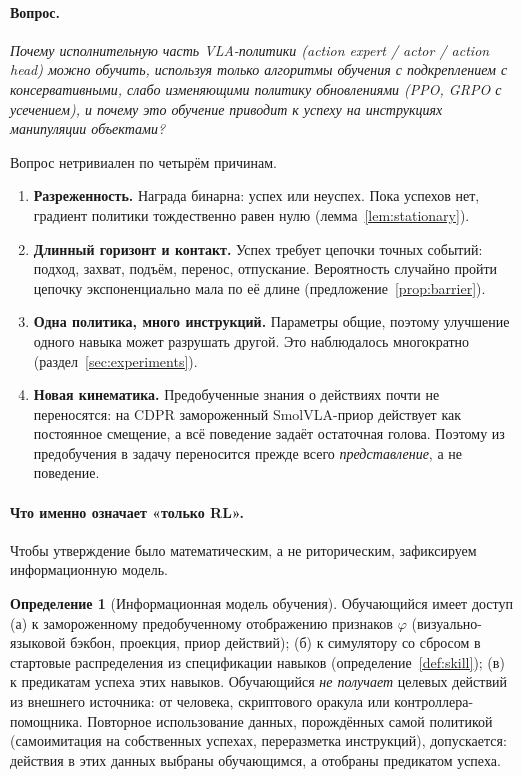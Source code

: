 \documentclass[11pt,a4paper]{article}
\theoremstyle{plain}
\theoremstyle{definition}
\newtheorem{definition}[theorem]{Определение}
\theoremstyle{remark}
\begin{document}
\paragraph{Вопрос.} \emph{Почему исполнительную часть VLA-политики (action expert / actor / action head) можно обучить, используя только алгоритмы обучения с подкреплением с консервативными, слабо изменяющими политику обновлениями (PPO, GRPO с усечением), и почему это обучение приводит к успеху на инструкциях манипуляции объектами?}

Вопрос нетривиален по четырём причинам.
\begin{enumerate}[label=(\roman*)]
\item \textbf{Разреженность.} Награда бинарна: успех или неуспех. Пока успехов нет, градиент политики тождественно равен нулю (лемма~\ref{lem:stationary}).
\item \textbf{Длинный горизонт и контакт.} Успех требует цепочки точных событий: подход, захват, подъём, перенос, отпускание. Вероятность случайно пройти цепочку экспоненциально мала по её длине (предложение~\ref{prop:barrier}).
\item \textbf{Одна политика, много инструкций.} Параметры общие, поэтому улучшение одного навыка может разрушать другой. Это наблюдалось многократно (раздел~\ref{sec:experiments}).
\item \textbf{Новая кинематика.} Предобученные знания о действиях почти не переносятся: на CDPR замороженный SmolVLA-приор действует как постоянное смещение, а всё поведение задаёт остаточная голова. Поэтому из предобучения в задачу переносится прежде всего \emph{представление}, а не поведение.
\end{enumerate}

\paragraph{Что именно означает «только RL».} Чтобы утверждение было математическим, а не риторическим, зафиксируем информационную модель.

\begin{definition}[Информационная модель обучения]\label{def:info}
Обучающийся имеет доступ
(а) к замороженному предобученному отображению признаков $\varphi$ (визуально-языковой бэкбон, проекция, приор действий);
(б) к симулятору со сбросом в стартовые распределения из спецификации навыков (определение~\ref{def:skill});
(в) к предикатам успеха этих навыков.
Обучающийся \emph{не получает} целевых действий из внешнего источника: от человека, скриптового оракула или контроллера-помощника. Повторное использование данных, порождённых самой политикой (самоимитация на собственных успехах, переразметка инструкций), допускается: действия в этих данных выбраны обучающимся, а отобраны предикатом успеха.
\end{definition}
\end{document}

